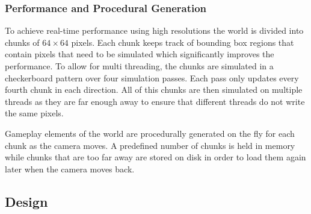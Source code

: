 \documentclass[a4paper]{article}
\begin{document}
\subsubsection{Performance and Procedural Generation}
To achieve real-time performance using high resolutions the world is divided into chunks of $64 \times 64$ pixels. Each chunk keeps track of bounding box regions that contain pixels that
need to be simulated which significantly improves the performance.
To allow for multi threading, the chunks are simulated in a checkerboard pattern
over four simulation passes. Each pass only updates every fourth chunk in each direction. All of this chunks are then simulated on multiple threads as they are far enough away to ensure that different threads do not write the same pixels.\par\noindent
Gameplay elements of the world are procedurally generated on the fly for each chunk as the camera moves. A predefined number of chunks is held in memory while chunks that are too far away are stored on disk in order to load them again later when the camera moves back.






\subsection{Design}
\end{document}
